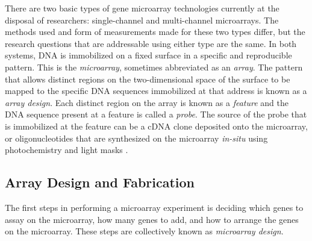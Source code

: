 There are two basic types of gene microarray technologies currently at the
disposal of researchers: single-channel and multi-channel microarrays.  The
methods used and form of measurements made for these two types differ, but the
research questions that are addressable using either type are the same.  In
both systems, DNA is immobilized on a fixed surface in a specific and
reproducible pattern.  This is the \emph{microarray}, sometimes abbreviated as
an \emph{array}.  The pattern that allows distinct regions on the
two-dimensional space of the surface to be mapped to the specific DNA sequences
immobilized at that address is known as a \emph{array design}.  Each distinct
region on the array is known as a \emph{feature} and the DNA sequence present
at a feature is called a \emph{probe}.  The source of the probe that is
immobilized at the feature can be a cDNA clone deposited onto the microarray,
or oligonucleotides that are synthesized on the microarray \emph{in-situ} using
photochemistry and light masks \cite{fodor,lipshutz}.

\subsection{Array Design and Fabrication}\label{ArrayDesign}

The first steps in performing a microarray experiment is deciding which genes
to assay on the microarray, how many genes to add, and how to arrange the genes
on the microarray.  These steps are collectively known as \emph{microarray
design}.

